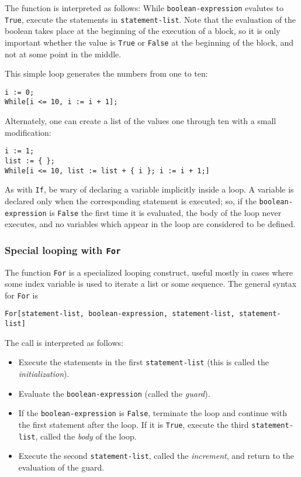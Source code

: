 The function is interpreted as follows: While
\verb+boolean-expression+ evalutes to \verb+True+, execute the
statements in \verb+statement-list+.  Note that the evaluation of the
boolean takes place at the beginning of the execution of a block, so
it is only important whether the value is \verb+True+ or \verb+False+
at the beginning of the block, and not at some point in the middle.

This simple loop generates the numbers from one to ten:

\begin{verbatim}
i := 0;
While[i <= 10, i := i + 1];
\end{verbatim}

\noindent Alternately, one can create a list of the values one through
ten with a small modification:

\begin{verbatim}
i := 1;
list := { };
While[i <= 10, list := list + { i }; i := i + 1;]
\end{verbatim}

As with \verb+If+, be wary of declaring a variable implicitly inside a
loop.  A variable is declared only when the corresponding statement is
executed; so, if the \verb+boolean-expression+ is \verb+False+ the
first time it is evaluated, the body of the loop never executes, and
no variables which appear in the loop are considered to be defined.

\subsubsection{Special looping with {\tt For}}

The function \verb+For+ is a specialized looping construct, useful
mostly in cases where some index variable is used to iterate a list or
some sequence.  The general syntax for \verb+For+ is

\begin{verbatim}
For[statement-list, boolean-expression, statement-list, statement-list]
\end{verbatim}

\noindent The call is interpreted as follows:
\begin{itemize}
\item Execute the statements in the first \verb+statement-list+ (this
is called the {\em initialization}).
\item Evaluate the \verb+boolean-expression+ (called the {\em guard}).
\item If the \verb+boolean-expression+ is \verb+False+, terminate the
loop and continue with the first statement after the loop.  If it is
\verb+True+, execute the third \verb+statement-list+, called the {\em
body} of the loop.
\item Execute the second \verb+statement-list+, called the {\em
increment}, and return to the evaluation of the guard.
\end{itemize}

